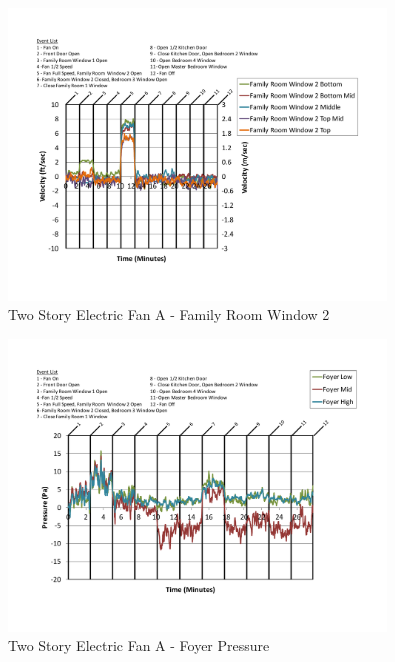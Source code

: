 \documentclass{article}
\begin{document}
\begin{appendices}
	\begin{figure}[H]
		\centering
		\includegraphics[height=3.05in,trim=0.67in 1.1in 0.67in 0.8in,clip=true]{0_Images/Results_Charts/ColdFlow/Two_Story/Electric/A/Family_Room_Window_2.pdf}
		\caption{Two Story Electric Fan A - Family Room Window 2}
	\end{figure}
 

	\begin{figure}[H]
		\centering
		\includegraphics[height=3.05in,trim=0.67in 1.1in 0.67in 0.8in,clip=true]{0_Images/Results_Charts/ColdFlow/Two_Story/Electric/A/Foyer_Pressure.pdf}
		\caption{Two Story Electric Fan A - Foyer Pressure}
	\end{figure}
 
	\clearpage


\end{appendices}
\end{document}
